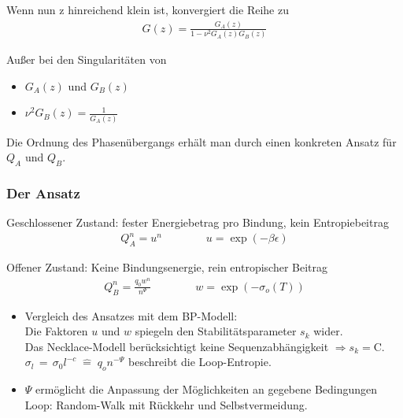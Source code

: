 \begin{frame}
Wenn nun z hinreichend klein ist, konvergiert die Reihe zu
\begin{align*}
G(z)=\frac{G_A(z)}{1-\nu^2 G_A(z)G_B(z)}
\end{align*}

Außer bei den Singularitäten von
\begin{itemize}
\item  $G_A(z)$ und $G_B(z)$ 
\item $\nu ^2 G_B(z)=\frac{1}{G_A(z)}$
\end{itemize}
\vspace{0.3cm}
Die Ordnung des Phasenübergangs erhält man durch einen konkreten Ansatz für $Q_A$ und $Q_B$.
\end{frame}



\begin{frame}
\frametitle{Der Ansatz}
\small Geschlossener Zustand: fester Energiebetrag pro Bindung, kein Entropiebeitrag
\begin{align*}
Q_A^n=u^n\qquad \qquad u=\exp(-\beta \epsilon)
\end{align*}

\vspace{0.15cm}
\small Offener Zustand: Keine Bindungsenergie, rein entropischer Beitrag
\begin{align*}
Q_B^n=\frac{q_0 w^n}{n^\Psi} \qquad \qquad w=\exp(-\sigma_o(T))
\end{align*}
\begin{itemize}
\item Vergleich des Ansatzes mit dem BP-Modell:\\
Die Faktoren $u$ und $w$ spiegeln den Stabilitätsparameter $s_k$ wider.\\
Das Necklace-Modell berücksichtigt keine Sequenzabhängigkeit $\Rightarrow s_k=\text{C}$.\\
$\sigma_l \,=\, \sigma_0 l^{-c}\; \hat{=}\; q_o n^{-\Psi}$ beschreibt die Loop-Entropie.\\
\item $\Psi$ ermöglicht die Anpassung der Möglichkeiten an gegebene Bedingungen\\
Loop: Random-Walk mit Rückkehr und Selbstvermeidung.
\end{itemize}

\end{frame}

